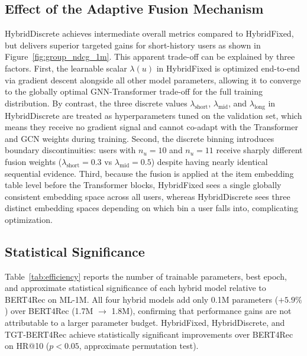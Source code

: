 \documentclass[12pt,a4paper]{report}
\begin{document}
\subsection*{Effect of the Adaptive Fusion Mechanism}

\justifying
HybridDiscrete achieves intermediate overall metrics compared to \mbox{HybridFixed},
but delivers superior targeted gains for short-history users as shown in
Figure~\ref{fig:group_ndcg_1m}. This apparent trade-off can be explained by
three factors. First, the learnable scalar \(\lambda(u)\) in \mbox{HybridFixed} is
optimized end-to-end via gradient descent alongside all other model parameters,
allowing it to converge to the globally optimal GNN-Transformer trade-off for
the full training distribution. By contrast, the three discrete values
\(\lambda_{\text{short}}\), \(\lambda_{\text{mid}}\), and \(\lambda_{\text{long}}\)
in HybridDiscrete are treated as hyperparameters tuned on the validation set,
which means they receive no gradient signal and cannot co-adapt with the
Transformer and GCN weights during training. Second, the discrete binning
introduces boundary discontinuities: users with \(n_u = 10\) and \(n_u = 11\)
receive sharply different fusion weights (\(\lambda_{\text{short}} = 0.3\) vs
\(\lambda_{\text{mid}} = 0.5\)) despite having nearly identical sequential
evidence. Third, because the fusion is applied at the item embedding table
level before the Transformer blocks, \mbox{HybridFixed} sees a single globally
consistent embedding space across all users, whereas HybridDiscrete sees three
distinct embedding spaces depending on which bin a user falls into,
complicating optimization.

\subsection*{Statistical Significance}

\justifying
Table~\ref{tab:efficiency} reports the number of trainable parameters, best
epoch, and approximate statistical significance of each hybrid model relative
to BERT4Rec on ML-1M. All four hybrid models add only 0.1M parameters
(\(+5.9\%\)) over BERT4Rec (1.7M \(\rightarrow\) 1.8M), confirming that
performance gains are not attributable to a larger parameter budget.
\mbox{HybridFixed}, HybridDiscrete, and TGT-BERT4Rec achieve statistically
significant improvements over BERT4Rec on HR@10 (\(p < 0.05\), approximate
permutation test).
\end{document}
